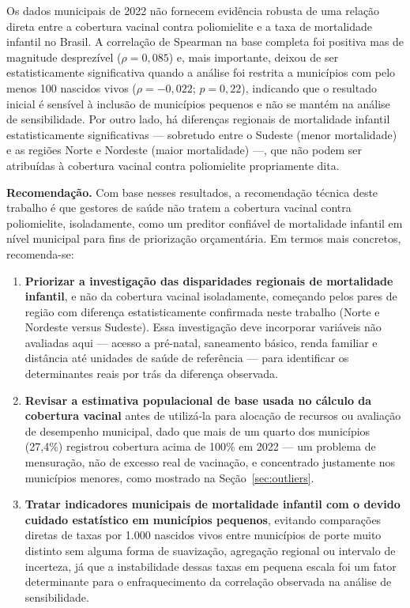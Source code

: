\documentclass[pdflatex,sn-mathphys-num]{sn-jnl}
\begin{document}
Os dados municipais de 2022 não fornecem evidência robusta de uma relação direta entre a cobertura vacinal contra poliomielite e a taxa de mortalidade infantil no Brasil. A correlação de Spearman na base completa foi positiva mas de magnitude desprezível ($\rho = 0{,}085$) e, mais importante, deixou de ser estatisticamente significativa quando a análise foi restrita a municípios com pelo menos 100 nascidos vivos ($\rho = -0{,}022$; $p = 0{,}22$), indicando que o resultado inicial é sensível à inclusão de municípios pequenos e não se mantém na análise de sensibilidade. Por outro lado, há diferenças regionais de mortalidade infantil estatisticamente significativas — sobretudo entre o Sudeste (menor mortalidade) e as regiões Norte e Nordeste (maior mortalidade) —, que não podem ser atribuídas à cobertura vacinal contra poliomielite propriamente dita.

\textbf{Recomendação.} Com base nesses resultados, a recomendação técnica deste trabalho é que gestores de saúde não tratem a cobertura vacinal contra poliomielite, isoladamente, como um preditor confiável de mortalidade infantil em nível municipal para fins de priorização orçamentária. Em termos mais concretos, recomenda-se:

\begin{enumerate}
\item \textbf{Priorizar a investigação das disparidades regionais de mortalidade infantil}, e não da cobertura vacinal isoladamente, começando pelos pares de região com diferença estatisticamente confirmada neste trabalho (Norte e Nordeste versus Sudeste). Essa investigação deve incorporar variáveis não avaliadas aqui — acesso a pré-natal, saneamento básico, renda familiar e distância até unidades de saúde de referência — para identificar os determinantes reais por trás da diferença observada.
\item \textbf{Revisar a estimativa populacional de base usada no cálculo da cobertura vacinal} antes de utilizá-la para alocação de recursos ou avaliação de desempenho municipal, dado que mais de um quarto dos municípios (27,4\%) registrou cobertura acima de 100\% em 2022 — um problema de mensuração, não de excesso real de vacinação, e concentrado justamente nos municípios menores, como mostrado na Seção~\ref{sec:outliers}.
\item \textbf{Tratar indicadores municipais de mortalidade infantil com o devido cuidado estatístico em municípios pequenos}, evitando comparações diretas de taxas por 1.000 nascidos vivos entre municípios de porte muito distinto sem alguma forma de suavização, agregação regional ou intervalo de incerteza, já que a instabilidade dessas taxas em pequena escala foi um fator determinante para o enfraquecimento da correlação observada na análise de sensibilidade.
\end{enumerate}
\end{document}
